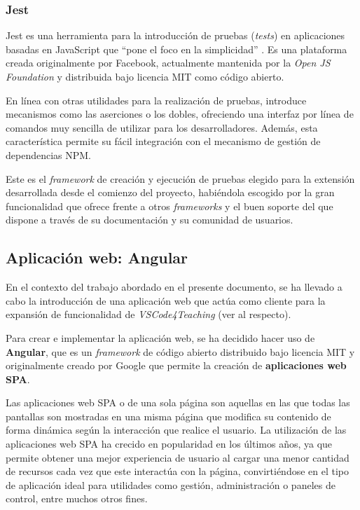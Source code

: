 \subsubsection{Jest}
Jest es una herramienta para la introducción de pruebas (\textit{tests}) en aplicaciones basadas en JavaScript que ``pone el foco en la simplicidad'' \cite{Tec_Jest}. Es una plataforma creada originalmente por Facebook, actualmente mantenida por la \textit{Open JS Foundation} y distribuida bajo licencia MIT como código abierto.

En línea con otras utilidades para la realización de pruebas, introduce mecanismos como las aserciones o los dobles, ofreciendo una interfaz por línea de comandos muy sencilla de utilizar para los desarrolladores. Además, esta característica permite su fácil integración con el mecanismo de gestión de dependencias NPM.

Este es el \textit{framework} de creación y ejecución de pruebas elegido para la extensión desarrollada desde el comienzo del proyecto, habiéndola escogido por la gran funcionalidad que ofrece frente a otros \textit{frameworks} y el buen soporte del que dispone a través de su documentación y su comunidad de usuarios.

\subsection{Aplicación web: Angular}
\label{subsec:tecAppWeb}
En el contexto del trabajo abordado en el presente documento, se ha llevado a cabo la introducción de una aplicación web que actúa como cliente para la expansión de funcionalidad de \textit{VSCode4Teaching} (ver  al respecto).

Para crear e implementar la aplicación web, se ha decidido hacer uso de \textbf{Angular}, que es un \textit{framework} de código abierto distribuido bajo licencia MIT y originalmente creado por Google que permite la creación de \textbf{aplicaciones web SPA}.

Las aplicaciones web SPA o de una sola página son aquellas en las que todas las pantallas son mostradas en una misma página que modifica su contenido de forma dinámica según la interacción que realice el usuario. La utilización de las aplicaciones web SPA ha crecido en popularidad en los últimos años, ya que permite obtener una mejor experiencia de usuario al cargar una menor cantidad de recursos cada vez que este interactúa con la página, convirtiéndose en el tipo de aplicación ideal para utilidades como gestión, administración o paneles de control, entre muchos otros fines.


